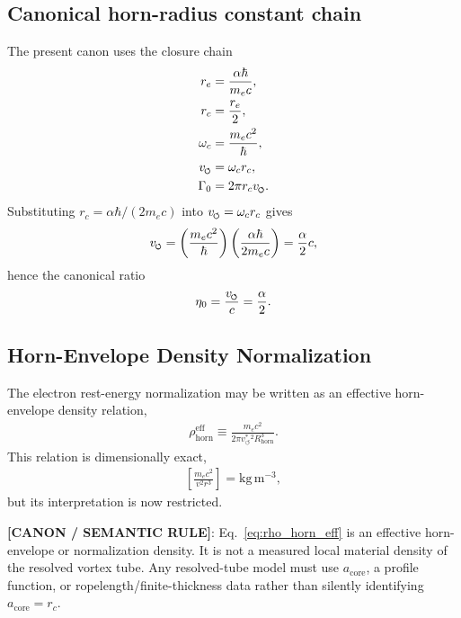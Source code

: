 \documentclass[11pt]{article}
\theoremstyle{definition}
\theoremstyle{plain}
\theoremstyle{remark}
\newcommand{\swirlarrow}{\mathchoice{\mkern-2mu\scriptstyle\boldsymbol{\circlearrowleft}}{\mkern-2mu\scriptstyle\boldsymbol{\circlearrowleft}}{\mkern-2mu\scriptscriptstyle\boldsymbol{\circlearrowleft}}{\mkern-2mu\scriptscriptstyle\boldsymbol{\circlearrowleft}}}
\newcommand{\rc}{{r_c}}
\newcommand{\vchar}{v_{\!\boldsymbol{\circlearrowleft}}^{\ast}}
\begin{document}
        \subsection{Canonical horn-radius constant chain}
            The present canon uses the closure chain
            \begin{align}
                r_e &= \frac{\alpha \hbar}{m_e c}, \\
                r_c &= \frac{r_e}{2}, \\
                \omega_c &= \frac{m_e c^2}{\hbar}, \\
                v_{\swirlarrow} &= \omega_c r_c, \\
                \Gamma_0 &= 2\pi r_c v_{\swirlarrow}.
            \end{align}
            Substituting $r_c = \alpha\hbar/(2m_e c)$ into $v_{\swirlarrow}=\omega_c r_c$ gives
            \begin{align}
                v_{\swirlarrow}
                =
                \left(\frac{m_e c^2}{\hbar}\right)
                \left(\frac{\alpha \hbar}{2m_e c}\right)
                = \frac{\alpha}{2}c,
            \end{align}
            hence the canonical ratio
            \begin{align}
                \eta_0 = \frac{v_{\swirlarrow}}{c} = \frac{\alpha}{2}.
            \end{align}

        \subsection{Horn-Envelope Density Normalization}
            The electron rest-energy normalization may be written as an effective horn-envelope density relation,
            \begin{align}
                \rho_{\mathrm{horn}}^{\mathrm{eff}}
                \equiv
                \frac{m_e c^2}{2\pi \vchar{}^2 R_{\mathrm{horn}}^3}.
                \label{eq:rho_horn_eff}
            \end{align}
            This relation is dimensionally exact,
            \begin{align}
                \left[\frac{m_e c^2}{v^2 r^3}\right]
                =
                \mathrm{kg\,m^{-3}},
            \end{align}
            but its interpretation is now restricted.

            \textbf{[CANON / SEMANTIC RULE]}: Eq.~\eqref{eq:rho_horn_eff} is an effective horn-envelope or normalization density. It is not a measured local material density of the resolved vortex tube. Any resolved-tube model must use $a_{\mathrm{core}}$, a profile function, or ropelength/finite-thickness data rather than silently identifying $a_{\mathrm{core}}=\rc$.
\end{document}
